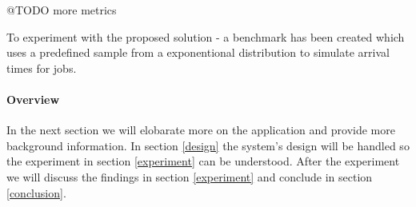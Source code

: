 @TODO more metrics 

To experiment with the proposed solution - a benchmark
has been created which uses a predefined sample from a exponentional
distribution to simulate arrival times for jobs. 


\paragraph{Overview}
In the next section we will elobarate more on the application and
provide more background information. In section \ref{design} the
system's design will be handled so the experiment in section
\ref{experiment} can be understood. After the experiment we will
discuss the findings in section \ref{experiment} and conclude in
section \ref{conclusion}.

